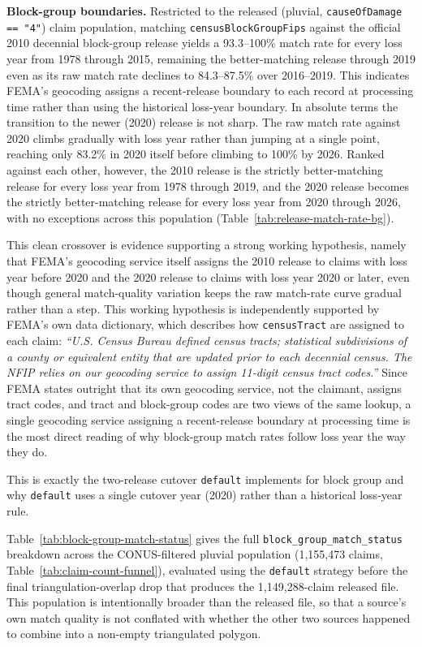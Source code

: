 \textbf{Block-group boundaries.} Restricted to the released
(pluvial, \texttt{causeOfDamage == "4"}) claim population, matching
\texttt{censusBlockGroupFips} against the official 2010 decennial
block-group release yields a 93.3--100\% match rate for every loss
year from 1978 through 2015, remaining the better-matching release
through 2019 even as its raw match rate declines to 84.3--87.5\% over
2016--2019. This indicates FEMA's geocoding assigns a recent-release
boundary to each record at processing time rather than using the
historical loss-year boundary. In absolute terms the transition to the
newer (2020) release is not sharp. The raw match rate against 2020
climbs gradually with loss year rather than jumping at a single point,
reaching only 83.2\% in 2020 itself before climbing to 100\% by 2026.
Ranked against each other, however, the 2010 release is the strictly
better-matching release for every loss year from 1978 through 2019,
and the 2020 release becomes the strictly better-matching release for
every loss year from 2020 through 2026, with no exceptions across this
population (Table~\ref{tab:release-match-rate-bg}).

This clean crossover is evidence supporting a strong working
hypothesis, namely that FEMA's geocoding service itself assigns the
2010 release to claims with loss year before 2020 and the 2020 release
to claims with loss year 2020 or later, even though general
match-quality variation keeps the raw match-rate curve gradual rather
than a step. This working hypothesis is independently supported by
FEMA's own data dictionary, which describes how \texttt{censusTract} are assigned to each claim: 
\emph{``U.S. Census Bureau defined census tracts; statistical subdivisions of a county or equivalent entity that are updated prior to each decennial
census. The NFIP relies on our geocoding service to assign 11-digit
census tract codes.''} 
%
Since FEMA states outright that its own geocoding service, not the claimant, assigns
tract codes, and tract and block-group codes are two views of the same
lookup, a single geocoding service assigning a recent-release boundary
at processing time is the most direct reading of why block-group match
rates follow loss year the way they do.

This is exactly the two-release cutover \texttt{default} implements
for block group and why \texttt{default} uses a single cutover
year (2020) rather than a historical loss-year rule.

Table~\ref{tab:block-group-match-status} gives the full
\texttt{block\_group\_match\_status} breakdown across the CONUS-filtered
pluvial population (1,155,473 claims, Table~\ref{tab:claim-count-funnel}),
evaluated using the \texttt{default} strategy before the final
triangulation-overlap drop that produces the 1,149,288-claim released
file. This population is intentionally broader than the released file,
so that a source's own match quality is not conflated with whether the
other two sources happened to combine into a non-empty triangulated
polygon.

